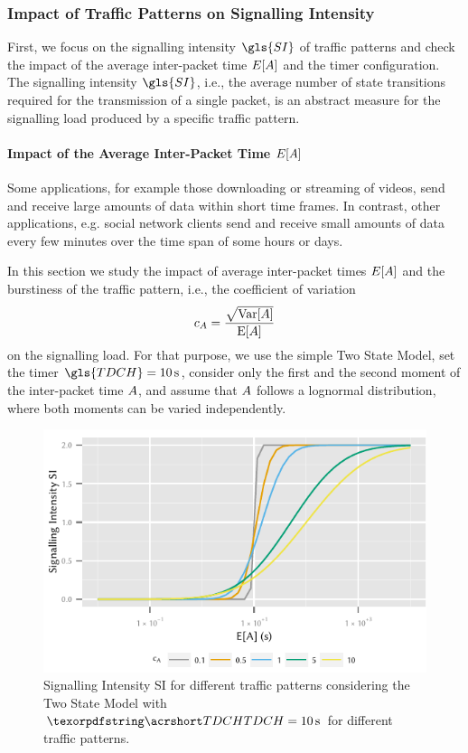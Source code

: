 \subsubsection*{Impact of Traffic Patterns on Signalling Intensity}\label{sec:network:performance_model:signalling_intensity}
First, we focus on the signalling intensity \(\gls{SI}\) of traffic patterns and check the impact of the average inter-packet time \(E[A]\) and the timer configuration. The signalling intensity \(\gls{SI}\), i.e., the average number of state transitions required for the transmission of a single packet, is an abstract measure for the signalling load produced by a specific traffic pattern.

\paragraph*{Impact of the Average Inter-Packet Time \(E[A]\)}\label{sec:network:performance_model:signalling_intensity:ea}
Some applications, for example those downloading or streaming of videos, send and receive large amounts of data within short time frames.
In contrast, other applications, e.g. social network clients send and receive small amounts of data every few minutes over the time span of some hours or days.

In this section we study the impact of average inter-packet times \(E[A]\) and the burstiness of the traffic pattern, i.e., the coefficient of variation 
\[c_{A} = \frac{\sqrt{\mathrm{Var}[A]}}{\mathrm{E}[A]}\]
 on the signalling load.
For that purpose, we use the simple Two State Model, set the timer \(\gls{TDCH}=\SI{10}{\second}\), consider only the first and the second moment of the inter-packet time \(A\), and assume that \(A\) follows a lognormal distribution, where both moments can be varied independently.

\begin{figure}
	\centering
	\includegraphics{network/performance_model/numerical_examples/figures/2state_ea_si}
	\caption{Signalling Intensity \gls{SI} for different traffic patterns considering the Two State Model with \(\headershortacr{TDCH}=\SI{10}{\second}\) for different traffic patterns.}
	\label{fig:network:performance_model:numerical_examples:validations:analytic_vs_simulation:2state_ea_si}
\end{figure}

